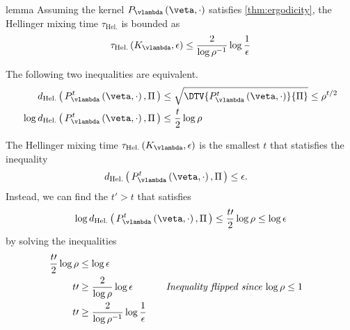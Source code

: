 
\begin{theoremEnd}{lemma}\label{thm:mixing_time}
  Assuming the kernel \(P_{\vlambda}\left(\veta, \cdot\right)\) satisfies \cref{thm:ergodicity}, the Hellinger mixing time \(\tau_{\text{Hel.}}\) is bounded as
  \begin{align*}
    \tau_{\text{Hel.}}\left(K_{\vlambda}, \epsilon\right) \leq  \frac{2}{\log \rho^{-1}} \log \frac{1}{\epsilon}
  \end{align*}
\end{theoremEnd}
\begin{proofEnd}
  The following two inequalities are equivalent.
  \begin{align*}
    d_{\text{Hel.}}\left(\, P^t_{\vlambda}\left(\veta, \cdot \right), \Pi \,\right)
    &\leq \sqrt{\DTV{ P^t_{\vlambda}\left(\veta, \cdot \right)}{\Pi}}
    \leq \rho^{t / 2}
    \\
    \log d_{\text{Hel.}}\left(\, P^t_{\vlambda}\left(\veta, \cdot \right), \Pi \,\right)
    &\leq \frac{t}{2} \log \rho
  \end{align*}

  The Hellinger mixing time \(\tau_{\text{Hel.}}\left(K_{\vlambda}, \epsilon\right)\) is the smallest \(t\) that statisfies the inequality
  \begin{align*}
    d_{\text{Hel.}}\left(\, P^t_{\vlambda}\left(\veta, \cdot \right), \Pi \,\right)
    &\leq 
    \epsilon.
  \end{align*}
  Instead, we can find the \(t\prime > t\) that satisfies
  \begin{align*}
    \log d_{\text{Hel.}}\left(\, P^t_{\vlambda}\left(\veta, \cdot \right), \Pi \,\right)
    \leq 
    \frac{t\prime}{2} \log \rho
    \leq 
    \log \epsilon
 \end{align*}
  by solving the inequalities
  \begin{alignat*}{2}
    \frac{t\prime}{2} \log \rho
    &\leq 
    \log \epsilon
    \\
    t\prime 
    &\geq 
    \frac{2}{\log \rho} \log \epsilon
    &&\quad\text{\textit{Inequality flipped since \(\log \rho \leq 1\)}}
    \\
    t\prime 
    &\geq 
    \frac{2}{\log \rho^{-1}} \log \frac{1}{\epsilon}
 \end{alignat*}
\end{proofEnd}

